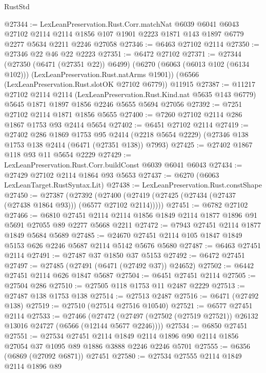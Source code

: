 \begin{lexlean}{RustStd}
\begin{coremodule}
@27344 := LexLeanPreservation.Rust.Corr.matchNat
    @6039
    @6041
    @6043
    @27102
    @2114
    @2114
    @1856
    @107
    @1901
    @2223
    @1871
    @143
    @1897
    @6779
    @2277
    @5634
    @2211
    @2246
    @27058
@27346 := @6463 @27102 @2114
@27350 := @27346 @22 @46 @22 @2223
@27351 := @6472 @27102
@27371 := @27344
    (@27350 (@6471 (@27351 @22)) @6499)
    (@6270 (@6063 (@6013 @102 (@6134 @102))) (LexLeanPreservation.Rust.natArms @1901))
    (@6566 (LexLeanPreservation.Rust.slotOK @27102 @6779))
    @11915
@27387 := @11217
    @27102
    @2114
    @2114
    (LexLeanPreservation.Rust.Kind.nat @5635 @143 @6779)
    @5645
    @1871
    @1897
    @1856
    @2246
    @5655
    @5694
    @27056
@27392 := @7251 @27102 @2114 @1871 @1856 @5655
@27400 := @7260 @27102 @2114 @286 @1867 @1753 @93 @2414 @5654
@27402 := @6451 @27102 @2114
@27419 := @27402
    @286
    @1869
    @1753
    @95
    @2414
    (@2218 @5654 @2229)
    (@27346 @138 @1753 @138 @2414 (@6471 (@27351 @138)) @7993)
@27425 := @27402 @1867 @118 @93 @11 @5654 @2229
@27429 := LexLeanPreservation.Rust.Corr.buildConst @6039 @6041 @6043
@27434 := @27429 @27102 @2114 @1864 @93 @5653
@27437 := @6270 (@6063 LexLeanTarget.RustSyntax.Lit)
@27438 := LexLeanPreservation.Rust.constShape
@27450 := @27387
    (@27392 (@27400 (@27419 (@27425 (@27434 (@27437 (@27438 @1864 @93))) (@6577 @27102 @2114)))))
@27451 := @6782 @27102
@27466 := @6810
    @27451
    @2114
    @2114
    @1856
    @1849
    @2114
    @1877
    @1896
    @91
    @5691
    @27055
    @89
    @2277
    @5668
    @2211
@27472 := @7943 @27451 @2114 @1877 @1849 @5684 @5689
@27485 := @24670 @27451 @2114 @105 @1847 @1849 @5153 @626 @2246 @5687 @2114 @5142 @5676 @5680
@27487 := @6463 @27451 @2114
@27491 := @27487 @37 @1850 @37 @5153
@27492 := @6472 @27451
@27497 := @27485 (@27491 (@6471 (@27492 @37)) @24652)
@27502 := @6442 @27451 @2114 @626 @1847 @5687
@27504 := @6451 @27451 @2114
@27505 := @27504 @286
@27510 := @27505 @118 @1753 @11 @2487 @2229
@27513 := @27487 @138 @1753 @138
@27514 := @27513 @2487
@27516 := @6471 (@27492 @138)
@27519 := @27510 (@27514 @27516 @10540)
@27521 := @6577 @27451 @2114
@27533 := @27466
    (@27472 (@27497 (@27502 (@27519 @27521)) @26132 @13016 @24727 (@6566 (@12144 @5677 @2246))))
@27534 := @6850 @27451
@27551 := @27534
    @27451
    @2114
    @1849
    @2114
    @1896
    @90
    @2114
    @1856
    @27054
    @37
    @1095
    @89
    @1886
    @3888
    @2246
    @2246
    @5701
@27555 := @6356 (@6869 (@27092 @6871)) @27451
@27580 := @27534
    @27555
    @2114
    @1849
    @2114
    @1896
    @89

\end{coremodule}
\end{lexlean}
